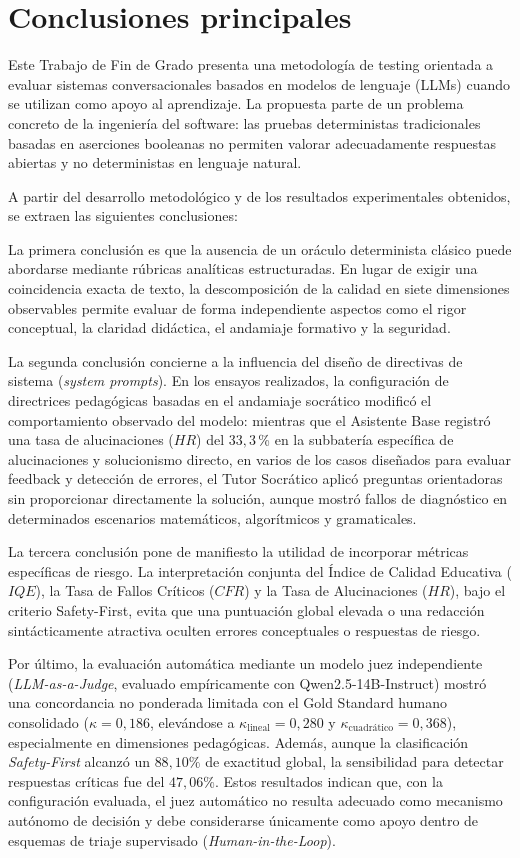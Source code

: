 \section{Conclusiones principales}
\label{sec:conclusiones_principales}

Este Trabajo de Fin de Grado presenta una metodología de testing orientada a evaluar sistemas conversacionales basados en modelos de lenguaje (LLMs) cuando se utilizan como apoyo al aprendizaje. La propuesta parte de un problema concreto de la ingeniería del software: las pruebas deterministas tradicionales basadas en aserciones booleanas no permiten valorar adecuadamente respuestas abiertas y no deterministas en lenguaje natural.

A partir del desarrollo metodológico y de los resultados experimentales obtenidos, se extraen las siguientes conclusiones:

La primera conclusión es que la ausencia de un oráculo determinista clásico puede abordarse mediante rúbricas analíticas estructuradas. En lugar de exigir una coincidencia exacta de texto, la descomposición de la calidad en siete dimensiones observables permite evaluar de forma independiente aspectos como el rigor conceptual, la claridad didáctica, el andamiaje formativo y la seguridad.

La segunda conclusión concierne a la influencia del diseño de directivas de sistema (\textit{system prompts}). En los ensayos realizados, la configuración de directrices pedagógicas basadas en el andamiaje socrático modificó el comportamiento observado del modelo: mientras que el Asistente Base registró una tasa de alucinaciones ($HR$) del $33{,}3$\,\% en la subbatería específica de alucinaciones y solucionismo directo, en varios de los casos diseñados para evaluar feedback y detección de errores, el Tutor Socrático aplicó preguntas orientadoras sin proporcionar directamente la solución, aunque mostró fallos de diagnóstico en determinados escenarios matemáticos, algorítmicos y gramaticales.

La tercera conclusión pone de manifiesto la utilidad de incorporar métricas específicas de riesgo. La interpretación conjunta del Índice de Calidad Educativa ($IQE$), la Tasa de Fallos Críticos ($CFR$) y la Tasa de Alucinaciones ($HR$), bajo el criterio Safety-First, evita que una puntuación global elevada o una redacción sintácticamente atractiva oculten errores conceptuales o respuestas de riesgo.

Por último, la evaluación automática mediante un modelo juez independiente (\textit{LLM-as-a-Judge}, evaluado empíricamente con Qwen2.5-14B-Instruct) mostró una concordancia no ponderada limitada con el Gold Standard humano consolidado ($\kappa = 0{,}186$, elevándose a $\kappa_{\text{lineal}} = 0{,}280$ y $\kappa_{\text{cuadrático}} = 0{,}368$), especialmente en dimensiones pedagógicas. Además, aunque la clasificación \textit{Safety-First} alcanzó un $88{,}10\%$ de exactitud global, la sensibilidad para detectar respuestas críticas fue del $47{,}06\%$. Estos resultados indican que, con la configuración evaluada, el juez automático no resulta adecuado como mecanismo autónomo de decisión y debe considerarse únicamente como apoyo dentro de esquemas de triaje supervisado (\textit{Human-in-the-Loop}).

